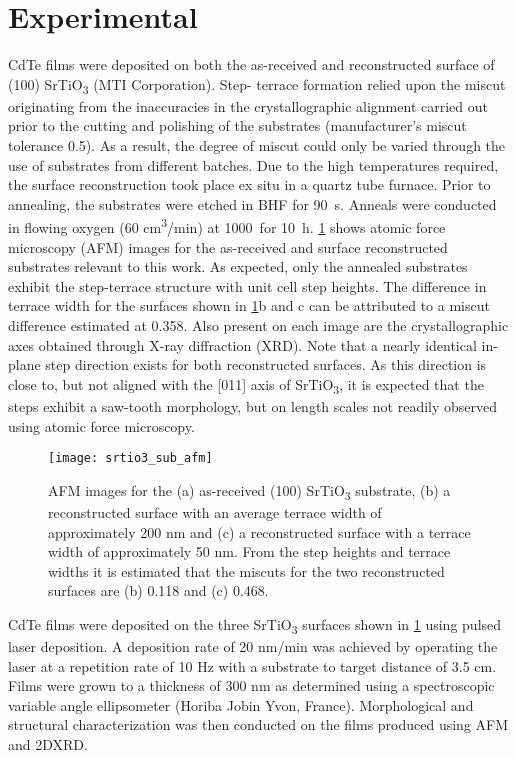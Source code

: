 \section{Experimental}
CdTe films were deposited on both the as-received and
reconstructed surface of (100) SrTiO\textsubscript{3} (MTI Corporation). Step-
terrace formation relied upon the miscut originating from the
inaccuracies in the crystallographic alignment carried out prior to
the cutting and polishing of the substrates (manufacturer’s miscut
tolerance 0.5\degree). As a result, the degree of miscut could only be
varied through the use of substrates from different batches. Due to
the high temperatures required, the surface reconstruction took
place ex situ in a quartz tube furnace. Prior to annealing, the
substrates were etched in BHF for 90~s. Anneals were conducted in
flowing oxygen (60 cm\textsuperscript{3}/min) at 1000\degree\celsius~for 10~h. \cref{fig:srtio3_sub_afm} shows
atomic force microscopy (AFM) images for the as-received and
surface reconstructed substrates relevant to this work. As
expected, only the annealed substrates exhibit the step-terrace
structure with unit cell step heights. The difference in terrace
width for the surfaces shown in \cref{fig:srtio3_sub_afm}b and c can be attributed to a
miscut difference estimated at 0.358\degree. Also present on each image
are the crystallographic axes obtained through X-ray diffraction
(XRD). Note that a nearly identical in-plane step direction exists for
both reconstructed surfaces. As this direction is close to, but not
aligned with the [011] axis of SrTiO\textsubscript{3}, it is expected that the steps
exhibit a saw-tooth morphology, but on length scales not readily
observed using atomic force microscopy.
\begin{figure}
    \centering
    \texttt{[image: srtio3\_sub\_afm]}
    \caption[AFM of SrTiO\textsubscript{3} surfaces]{\label{fig:srtio3_sub_afm}AFM images for the (a) as-received (100) SrTiO\textsubscript{3} substrate, (b) a reconstructed surface with an average terrace width of approximately 200 nm and (c) a reconstructed surface with a terrace width of approximately 50 nm. From the step heights and terrace widths it is estimated that the miscuts for the two reconstructed surfaces are (b) 0.118\degree{}
        and (c) 0.468\degree{}.}
\end{figure}

CdTe films were deposited on the three SrTiO\textsubscript{3} surfaces shown
in \cref{fig:srtio3_sub_afm} using pulsed laser deposition. A deposition rate of 20 nm/min was achieved by
operating the laser at a repetition rate of 10 Hz with a substrate to
target distance of 3.5 cm. Films were grown to
a thickness of 300 nm as determined using a spectroscopic variable
angle ellipsometer (Horiba Jobin Yvon, France). Morphological and
structural characterization was then conducted on the films
produced using AFM and 2DXRD.
